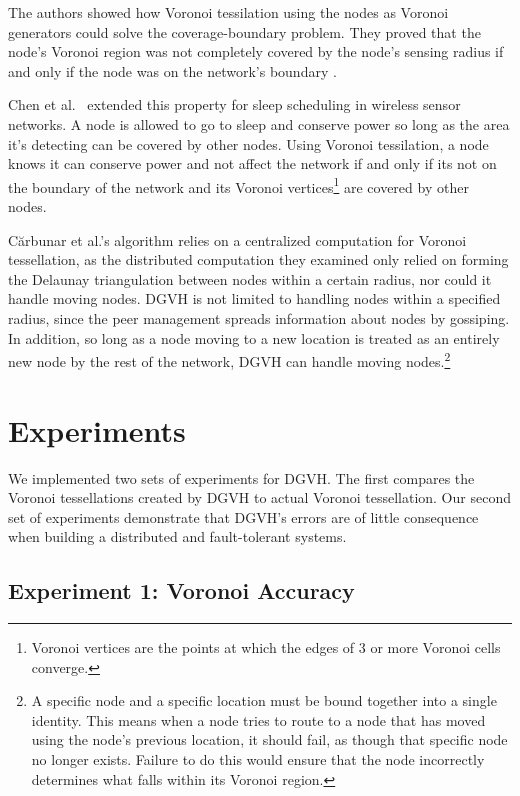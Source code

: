 \documentclass[11pt, conference, letterpaper]{IEEEtran}
\begin{document}
The authors showed how Voronoi tessilation using the nodes as Voronoi generators could solve the coverage-boundary problem.
They proved that the node's Voronoi region was not completely covered by the node's sensing radius if and only if the node was on the network's boundary \cite{carbunar2004distributed}.

Chen et al.\ \cite{chen2008voronoi} extended this property for sleep scheduling in wireless sensor networks.
A node is allowed to go to sleep and conserve power so long as the area it's detecting can be covered by other nodes.
Using Voronoi tessilation, a node knows it can conserve power and not affect the network if and only if its not on the boundary of the network and its Voronoi vertices\footnote{Voronoi vertices are the points at which the edges of 3 or more Voronoi cells converge.} are covered by other nodes.


C\u{a}rbunar et al.'s algorithm relies on a centralized computation for Voronoi tessellation, as the distributed computation they examined only relied on forming the Delaunay triangulation between nodes within a certain radius, nor could it handle moving nodes.
DGVH is not limited to handling nodes within a specified radius, since the peer management spreads information about nodes by gossiping. %
In addition, so long as a node moving to a new location is treated as an entirely new node by the rest of the network, DGVH can handle moving nodes.\footnote{A specific node and a specific location must be bound together into a single identity.
This means when a node tries to route to a node that has moved using the node's previous location, it should fail, as though that specific node no longer exists.  
Failure to do this would ensure that the node incorrectly determines what falls within its Voronoi region.}


\section{Experiments}
\label{sec:experiments}


We implemented two sets of experiments for DGVH.
The first compares the Voronoi tessellations created by DGVH to actual Voronoi tessellation.
Our second set of experiments demonstrate that DGVH's errors are of little consequence when building a distributed and fault-tolerant systems.

\subsection{Experiment 1: Voronoi Accuracy}
\end{document}

